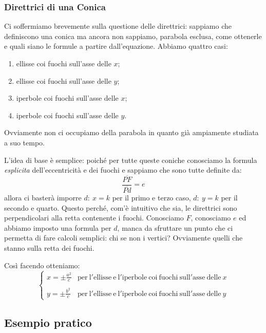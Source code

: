 \documentclass[a4paper, oneside]{article}
\begin{document}
		\subsubsection{Direttrici di una Conica}
			Ci soffermiamo brevemente sulla questione delle direttrici: sappiamo che definiscono una conica ma ancora non sappiamo, parabola esclusa, come ottenerle e quali siano le formule a partire dall'equazione. Abbiamo quattro casi:
			\begin{enumerate}
				\item ellisse coi fuochi sull'asse delle $x$;
				\item ellisse coi fuochi sull'asse delle $y$;
				\item iperbole coi fuochi sull'asse delle $x$;
				\item iperbole coi fuochi sull'asse delle $y$.
			\end{enumerate}
			Ovviamente non ci occupiamo della parabola in quanto già ampiamente studiata a suo tempo. 
			
			L'idea di base è semplice: poiché per tutte queste coniche conosciamo la formula \emph{esplicita} dell'eccentricità e dei fuochi e sappiamo che sono tutte definite da:
			\begin{equation*}
				\frac{\overline{PF}}{\overline{Pd}}=e
			\end{equation*}
			allora ci basterà imporre $d:\ x=k$ per il primo e terzo caso, $d:\ y=k$ per il secondo e quarto. Questo perché, com'è intuitivo che sia, le direttrici sono perpendicolari alla retta contenente i fuochi.
			Conosciamo $F$, conosciamo $e$ ed abbiamo imposto una formula per $d$, manca da sfruttare un punto  che ci permetta di fare calcoli semplici: chi se non i vertici? Ovviamente quelli che stanno sulla retta dei fuochi.
			
			Così facendo otteniamo:
			\begin{equation*}
				\left\{
				\begin{array}{ll}
					\displaystyle x=\pm \frac{a^2}{c} & \mathrm{per\ l'ellisse\ e\ l'iperbole\ coi\ fuochi\ sull'asse\ delle\ }x \\ \\
					\displaystyle y=\pm \frac{b^2}{c} & \mathrm{per\ l'ellisse\ e\ l'iperbole\ coi\ fuochi\ sull'asse\ delle\ }y
				\end{array} \right.
			\end{equation*}
			
			\subsection{Esempio pratico}
			
\end{document}
